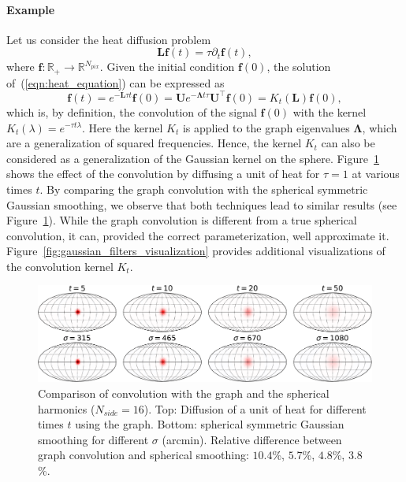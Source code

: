 \documentclass[final,twocolumn,3p,times,authoryear]{elsarticle}
\newcommand{\todo}[1]{{\color[rgb]{.6,.1,.6}{#1}}}
\newcommand{\figref}[1]{Figure~\ref{fig:#1}}
\newcommand{\eqnref}[1]{(\ref{eqn:#1})}
\renewcommand{\b}[1]{{\bm{#1}}}   %
\newcommand{\1}{\b{1}}              %
\newcommand{\0}{\b{0}}              %
\newcommand{\g}[1]{\b{#1}}
\renewcommand{\L}{\b{L}}
\newcommand{\U}{\b{U}}
\newcommand{\trans}{^\intercal}
\newcommand{\R}{\mathbb{R}}
\newcommand{\bLambda}{\b{\Lambda}}
\begin{document}
\paragraph{Example}
Let us consider the heat diffusion problem
\begin{equation} \label{eqn:heat_equation}
	\L \b{f}(t) = \tau \partial_t \b{f}(t),
\end{equation}
where $\b{f}: \R_+ \rightarrow \R^{N_{pix}}$. Given the initial condition
$\b{f}(0)$, the solution of~\eqnref{heat_equation} can be expressed as
\begin{equation*}
	\b{f}(t) = e^{-\L \tau t} \b{f}(0) = \U e^{-\bLambda t \tau} \U\trans \g{f}(0) = K_t(\L) \b{f}(0),
\end{equation*}
which is, by definition, the convolution of the signal $\b{f}(0)$ with the kernel $K_t(\lambda)=e^{-\tau t \lambda}$. Here the kernel $K_t$ is applied to the graph eigenvalues $\bLambda$, which are a generalization of squared frequencies. Hence, the kernel $K_t$ can also be considered as a generalization of the Gaussian kernel on the sphere. \figref{gaussian_filters_comparizon} shows the effect of the convolution by diffusing a unit of heat for $\tau=1$ at various times $t$. By comparing the graph convolution with the spherical symmetric Gaussian smoothing, we observe that both techniques lead to similar results (see \figref{gaussian_filters_comparizon}). While the graph convolution is different from a true spherical convolution, it can, provided the correct parameterization, well approximate it. \figref{gaussian_filters_visualization} provides additional visualizations of the convolution kernel $K_t$.

\begin{figure}
	\centering
	\includegraphics[width=\linewidth]{gaussian_filters_sphere}
	\caption{Comparison of convolution with the graph and the spherical harmonics ($N_{side} = 16$).
	Top: Diffusion of a unit of heat for different times $t$ using the graph.
	Bottom: spherical symmetric Gaussian smoothing for different $\sigma$ (arcmin).
	Relative difference between graph convolution and spherical smoothing: $10.4$\%, $5.7$\%, $4.8$\%, $3.8$\%.
	\todo{(i) Only three diffusion steps to have a bigger figure?}
\todo{(ii) The main issue with our filters is that their shape depends on the localization. It would be nice to measure the expectation and variance of the error over all locations. That would show how severe the distortion is.}}
	\label{fig:gaussian_filters_comparizon}
\end{figure}
\end{document}
